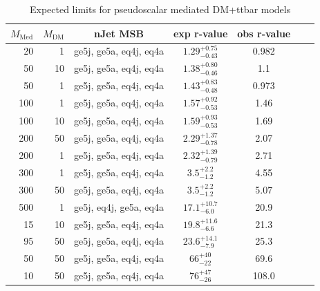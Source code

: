 \begin{table}
  \centering
  \begin{tabular}{rrccccc}
    \hline\hline
    $M_{\text{Med}}$ & $M_{\text{DM}}$ & nJet MSB & exp r-value & obs r-value \\
    \hline
       20 &   1 & ge5j, ge5a, eq4j, eq4a & $1.29_{-0.43}^{+0.75}$ & 0.982 \\
       50 &  10 & ge5j, ge5a, eq4j, eq4a & $1.38_{-0.46}^{+0.80}$ & 1.1 \\
       50 &   1 & ge5j, ge5a, eq4j, eq4a & $1.43_{-0.48}^{+0.83}$ & 0.973 \\
      100 &   1 & ge5j, ge5a, eq4j, eq4a & $1.57_{-0.53}^{+0.92}$ & 1.46 \\
      100 &  10 & ge5j, ge5a, eq4j, eq4a & $1.59_{-0.53}^{+0.93}$ & 1.69 \\
      200 &  50 & ge5j, ge5a, eq4j, eq4a & $2.29_{-0.78}^{+1.37}$ & 2.07 \\
      200 &   1 & ge5j, ge5a, eq4j, eq4a & $2.32_{-0.79}^{+1.39}$ & 2.71 \\
      300 &   1 & ge5j, ge5a, eq4j, eq4a & $3.5_{-1.2}^{+2.2}$    & 4.55 \\
      300 &  50 & ge5j, ge5a, eq4j, eq4a & $3.5_{-1.2}^{+2.2}$    & 5.07 \\
      500 &   1 & ge5j, eq4j, ge5a, eq4a & $17.1_{-6.0}^{+10.7}$  & 20.9 \\
       15 &  10 & ge5j, ge5a, eq4j, eq4a & $19.8_{-6.6}^{+11.6}$  & 21.3 \\
       95 &  50 & ge5j, ge5a, eq4j, eq4a & $23.6_{-7.9}^{+14.1}$  & 25.3 \\
       50 &  50 & ge5j, ge5a, eq4j, eq4a & $66_{-22}^{+40}$       & 69.6 \\
       10 &  50 & ge5j, ge5a, eq4j, eq4a & $76_{-26}^{+47}$       & 108.0 \\
    \hline\hline
  \end{tabular}
  \caption{Expected limits for pseudoscalar mediated DM+ttbar models}
  \label{tab:DMttPS_exp}
\end{table}








